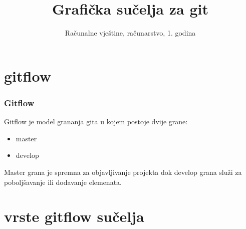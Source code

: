 \documentclass[hyperref={bookmarks=false},aspectratio=169]{beamer}
\title[Grafička sučelja za git]
{\bfseries{Grafička sučelja za git}}
\author[Sandro Šafar \and Stella Dumenić\and Robin Šćulac]
{}
\institute[Riteh]
\date[25.1.2019.]
{Računalne vještine, računarstvo, 1. godina}
\begin{document}
\frame{\titlepage}  %



\section{gitflow}

\begin{frame}

\frametitle{Gitflow}
Gitflow je model grananja gita u kojem postoje dvije grane:

\begin{itemize}
    \item master 
    \item develop
\end{itemize}

Master grana je spremna za objavljivanje projekta dok develop grana služi za poboljšavanje ili dodavanje elemenata.

\end{frame}



\section{vrste gitflow sučelja}





\end{document}
